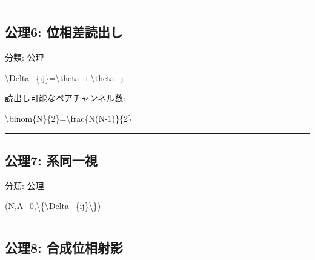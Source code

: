 \documentclass[
  a4paper,
]{ltjsarticle}
\newenvironment{Shaded}{}{}
\newcommand{\NormalTok}[1]{#1}
\begin{document}
\begin{center}\rule{0.5\linewidth}{0.5pt}\end{center}

\subsection{公理6:
位相差読出し}\label{ux516cux74066-ux4f4dux76f8ux5deeux8aadux51faux3057}

分類: 公理

\begin{Shaded}
\begin{Highlighting}[]
\NormalTok{\textbackslash{}Delta\_\{ij\}=\textbackslash{}theta\_i{-}\textbackslash{}theta\_j}
\end{Highlighting}
\end{Shaded}

読出し可能なペアチャンネル数:

\begin{Shaded}
\begin{Highlighting}[]
\NormalTok{\textbackslash{}binom\{N\}\{2\}=\textbackslash{}frac\{N(N{-}1)\}\{2\}}
\end{Highlighting}
\end{Shaded}

\begin{center}\rule{0.5\linewidth}{0.5pt}\end{center}

\subsection{公理7:
系同一視}\label{ux516cux74067-ux7cfbux540cux4e00ux8996}

分類: 公理

\begin{Shaded}
\begin{Highlighting}[]
\NormalTok{(N,A\_0,\textbackslash{}\{\textbackslash{}Delta\_\{ij\}\textbackslash{}\})}
\end{Highlighting}
\end{Shaded}

\begin{center}\rule{0.5\linewidth}{0.5pt}\end{center}

\subsection{公理8:
合成位相射影}\label{ux516cux74068-ux5408ux6210ux4f4dux76f8ux5c04ux5f71}
\end{document}
